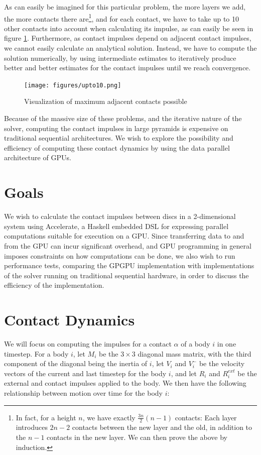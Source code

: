 \documentclass[runningheads,a4paper]{llncs}
\begin{document}
As can easily be imagined for this particular problem, the more layers we add,
the more contacts there are\footnote{In fact, for a height $n$, we have
  exactly $\frac{3n}{2}(n-1)$ contacts: Each layer introduces $2n-2$ contacts
  between the new layer and the old, in addition to the $n-1$ contacts in the
  new layer. We can then prove the above by induction.}, and for each contact,
we have to take up to 10 other contacts into account when calculating its
impulse, as can easily be seen in figure \ref{fig:upto10}. Furthermore, as
contact impulses depend on adjacent contact impulses, we cannot easily
calculate an analytical solution. Instead, we have to compute the solution
numerically, by using intermediate estimates to iteratively produce better and
better estimates for the contact impulses until we reach convergence.

\begin{figure}
  \centering
  \texttt{[image: figures/upto10.png]}
  \caption{Visualization of maximum adjacent contacts possible}
  \label{fig:upto10}
\end{figure}

Because of the massive size of these problems, and the iterative nature of the
solver, computing the contact impulses in large pyramids is expensive on
traditional sequential architectures. We wish to explore the possibility and
efficiency of computing these contact dynamics by using the data parallel
architecture of GPUs.

\section{Goals}

We wish to calculate the contact impulses between discs in a 2-dimensional
system using Accelerate, a Haskell embedded DSL for expressing parallel
computations suitable for execution on a GPU. Since transferring data to and
from the GPU can incur significant overhead, and GPU programming in general
imposes constraints on how computations can be done, we also wish to run
performance tests, comparing the GPGPU implementation with implementations of
the solver running on traditional sequential hardware, in order to discuss the
efficiency of the implementation.

\section{Contact Dynamics}

We will focus on computing the impulses for a contact $\alpha$ of a body $i$ in
one timestep. For a body $i$, let $M_i$ be the $3 \times 3$ diagonal mass
matrix, with the third component of the diagonal being the inertia of $i$, let
$V_i$ and $V_i^-$ be the velocity vectors of the current and last timestep for
the body $i$, and let $R_i$ and $R_i^{ext}$ be the external and contact impulses
applied to the body. We then have the following relationship between motion
over time for the body $i$:
\end{document}
